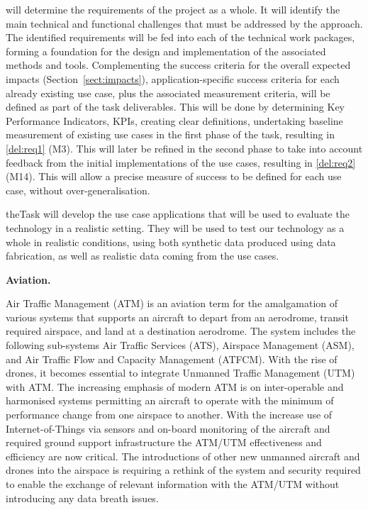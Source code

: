 \begin{Workpackage}{\thewpno}
\begin{Task}
\TaskResults{%
}
\TaskHeader{}
\theTask{} will determine the requirements of the \TheProject{} project as a whole.  It will identify the main technical and functional challenges that must be addressed by the \TheProject{} approach. The identified  requirements will be fed into each of the technical work packages, forming a foundation for the design and implementation of the associated methods and tools. Complementing the success criteria for the overall expected impacts (Section~\ref{sect:impacts}), application-specific success criteria for each already existing use case, plus the associated measurement criteria, will be defined as part of the task deliverables. This will be done by determining Key Performance Indicators, KPIs, creating clear definitions, undertaking baseline measurement of existing use cases in the first phase of the task, resulting in \ref{del:req1} (M3). This will later be refined in the second phase to take into account feedback from the initial implementations of the use cases, resulting in \ref{del:req2} (M14). This will allow a precise measure of success to be defined for each use case, without over-generalisation.
\end{Task}

\begin{Task}
\TaskResults{%
}
\TaskHeader{}
theTask{} will develop the use case applications that will be used to evaluate the \TheProject{} technology in a realistic setting. They will be used to test our technology as a whole in realistic conditions, using both synthetic data produced using data fabrication, as well as realistic data coming from the use cases.

\textbf{Aviation.} 

Air Traffic Management (ATM) is an aviation term for the amalgamation of various systems that supports an aircraft to depart from an aerodrome, transit required airspace, and land at a destination aerodrome. The system includes the following sub-systems Air Traffic Services (ATS), Airspace Management (ASM), and Air Traffic Flow and Capacity Management (ATFCM). With the rise of drones, it becomes essential to integrate Unmanned Traffic Management (UTM) with ATM. The increasing emphasis of modern ATM is on inter-operable and harmonised systems permitting an aircraft to operate with the minimum of performance change from one airspace to another. With the increase use of Internet-of-Things via sensors and on-board monitoring of the aircraft and required ground support infrastructure the ATM/UTM effectiveness and efficiency are now critical. The introductions of other new unmanned aircraft and drones into the airspace is requiring a rethink of the system and security required to enable the exchange of relevant information with the ATM/UTM without introducing any data breath issues.


\end{Task}
\end{Workpackage}
